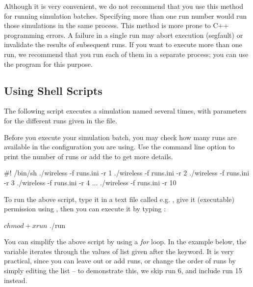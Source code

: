 \begin{warning}
  Although it is very convenient, we do not recommend that you use this method for
  running simulation batches. Specifying more than one run number
  would run those simulations in the same process. This method is more prone to C++ programming
  errors. A failure in a single run may abort execution (segfault) or invalidate the results of subsequent runs. If you want
  to execute more than one run, we recommend that you run each of them in a separate process;
  you can use the  program for this purpose.
\end{warning}


\subsection{Using Shell Scripts}
\label{sec:run-sim:batches-using-shell-scripts}

The following script executes a simulation named 
several times, with parameters for the different runs
given in the  file.

Before you execute your simulation batch, you may check how many
runs are available in the configuration you are using. Use the
 command line option to print the number of runs or
add the  to get more details.

\begin{filelisting}
#! /bin/sh
./wireless -f runs.ini -r 1
./wireless -f runs.ini -r 2
./wireless -f runs.ini -r 3
./wireless -f runs.ini -r 4
...
./wireless -f runs.ini -r 10
\end{filelisting}

To run the above script, type it in a text file called e.g. ,
give it  (executable) permission using ,
then you can execute it by typing :

\begin{commandline}
$ chmod +x run
$ ./run
\end{commandline}

You can simplify the above script by using a \textit{for} loop.
In the example below, the variable  iterates through
the values of list given after the  keyword.
It is very practical, since you can leave out or add runs,
or change the order of runs by simply editing the list --
to demonstrate this, we skip run 6, and include run 15 instead.


